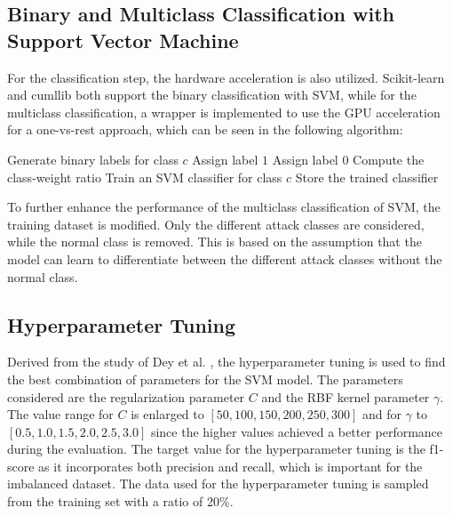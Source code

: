 \subsection{Binary and Multiclass Classification with Support Vector Machine}
For the classification step, the hardware acceleration is also utilized. Scikit-learn and cumllib both support the binary classification with SVM, while for the multiclass classification, a wrapper is implemented to use the GPU acceleration for a one-vs-rest approach, which can be seen in the following algorithm:

\begin{algorithm}[H]
\caption{Training procedure of the GPU One-vs-Rest SVM wrapper}
\label{alg:ovr_wrapper}
\begin{algorithmic}[1]
    \State Generate binary labels for class $c$
            \State Assign label $1$
        \Else
            \State Assign label $0$
        \EndIf
    \EndFor
    \State Compute the class-weight ratio
    \State Train an SVM classifier for class $c$
    \State Store the trained classifier
\EndFor
\end{algorithmic}
\end{algorithm}

\nextparagraph
To further enhance the performance of the multiclass classification of SVM, the training dataset is modified. Only the different attack classes are considered, while the normal class is removed. This is based on the assumption that the model can learn to differentiate between the different attack classes without the normal class.


\subsection{Hyperparameter Tuning}
Derived from the study of Dey et al. \cite{dey2023new}, the hyperparameter tuning is used to find the best combination of parameters for the SVM model. The parameters considered are the regularization parameter $C$ and the RBF kernel parameter $\gamma$. The value range for $C$ is enlarged to $[50, 100, 150, 200, 250, 300]$ and for $\gamma$ to $[0.5, 1.0, 1.5, 2.0, 2.5, 3.0]$ since the higher values achieved a better performance during the evaluation. The target value for the hyperparameter tuning is the f1-score as it incorporates both precision and recall, which is important for the imbalanced dataset. The data used for the hyperparameter tuning is sampled from the training set with a ratio of 20\%.

